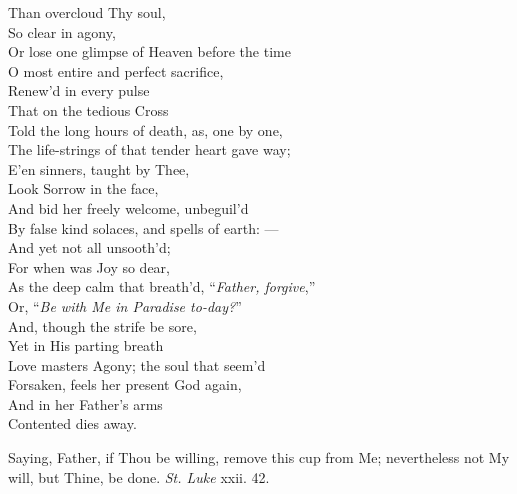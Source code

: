  Than overcloud Thy soul, \\
 So clear in agony, \\
  Or lose one glimpse of Heaven before the time \\
 O most entire and perfect sacrifice, \\
 Renew’d in every pulse \\
 That on the tedious Cross \\
  Told the long hours of death, as, one by one, \\
 The life-strings of that tender heart gave way; \\
 E’en sinners, taught by Thee, \\
 Look Sorrow in the face, \\
  And bid her freely welcome, unbeguil’d \\
 By false kind solaces, and spells of earth: — \\
 And yet not all unsooth’d; \\
 For when was Joy so dear, \\
  As the deep calm that breath’d, “\emph{Father, forgive},” \\
 Or, “\emph{Be with Me in Paradise to-day?}” \\
 And, though the strife be sore, \\
 Yet in His parting breath \\
  Love masters Agony; the soul that seem’d \\
 Forsaken, feels her present God again, \\
 And in her Father’s arms \\
 Contented dies away.\\


Saying, Father, if Thou be willing, remove this cup from Me; nevertheless not My will, but Thine, be done. \emph{St. Luke} xxii. 42.

